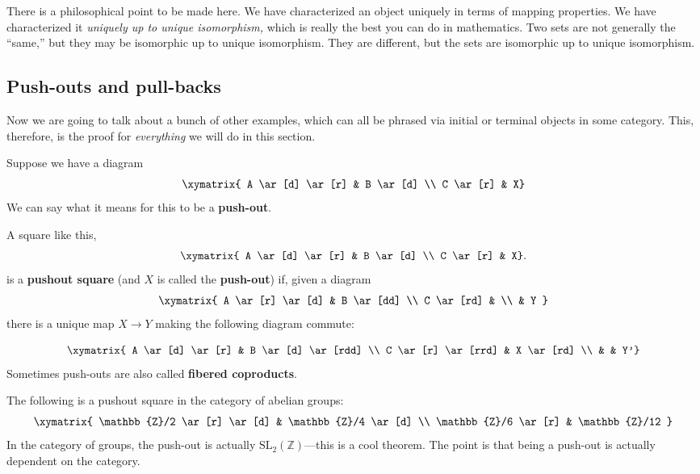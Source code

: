 There is a philosophical point to be made here. We have characterized an object
uniquely in terms of mapping properties. We have characterized it
\emph{uniquely up to unique isomorphism,} which is really the best you can do
in mathematics. Two sets are not generally the ``same,'' but they may be
isomorphic up to unique isomorphism. They are different,
but the sets are isomorphic up
to unique isomorphism.

\subsection{Push-outs and pull-backs}

Now we are going to talk about a bunch of other examples, which can all be
phrased via initial or terminal objects in some category. This,
therefore, is the proof for \emph{everything} we will do in this section.

Suppose we have a diagram
\[
\xymatrix{
A \ar[d] \ar[r] &  B \ar[d] \\
C \ar[r] &  X}
\]
We can say what it means for this to be a \textbf{push-out}.

\begin{definition}
A square like this,
\[
\xymatrix{
A \ar[d] \ar[r] &  B \ar[d] \\
C \ar[r] &  X}.
\]
is a \textbf{pushout square} (and $X$ is called the \textbf{push-out}) if,
given a diagram
\[ \xymatrix{
A \ar[r] \ar[d]  &  B \ar[dd] \\
C \ar[rd] & \\
& Y
}\]
there is a unique map $X \to Y$ making the following diagram commute:

\[
\xymatrix{
A \ar[d] \ar[r] &  B \ar[d] \ar[rdd] \\
C \ar[r] \ar[rrd] &  X \ar[rd] \\
& & Y'}
\]
Sometimes push-outs are also called \textbf{fibered coproducts}.
\end{definition}

\begin{example}
The following is a pushout square in the category of abelian groups:
\[ \xymatrix{
\mathbb{Z}/2 \ar[r] \ar[d]  &  \mathbb{Z}/4 \ar[d]  \\
\mathbb{Z}/6 \ar[r] &  \mathbb{Z}/12
}\]
In the category of groups, the push-out is actually
$\mathrm{SL}_2(\mathbb{Z})$---this is a cool theorem. The point is that being a
push-out is actually dependent on the category.
\end{example}

